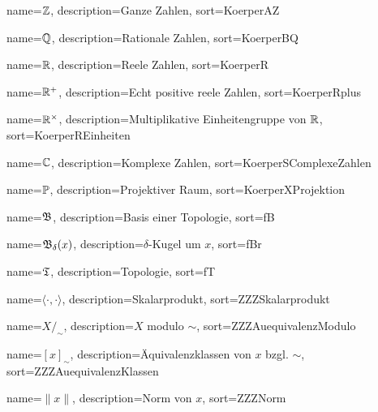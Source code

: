 {
  name={\ensuremath{\mdz}},
  description={Ganze Zahlen},
  sort=KoerperAZ
}

{
  name={\ensuremath{\mdq}},
  description={Rationale Zahlen},
  sort=KoerperBQ
}

{
  name={\ensuremath{\mdr}},
  description={Reele Zahlen},
  sort=KoerperR
}

{
  name={\ensuremath{\mdr^+}},
  description={Echt positive reele Zahlen},
  sort=KoerperRplus
}

{
  name={\ensuremath{\mdr^\times}},
  description={Multiplikative Einheitengruppe von $\mathbb{R}$},
  sort=KoerperREinheiten
}

{
  name={\ensuremath{\mdc}},
  description={Komplexe Zahlen},
  sort=KoerperSComplexeZahlen
}

{
  name={\ensuremath{\mdp}},
  description={Projektiver Raum},
  sort=KoerperXProjektion
}

{
  name={\ensuremath{\fB}},
  description={Basis einer Topologie},
  sort=fB
}

{
  name={\ensuremath{\fB_\delta(x)}},
  description={$\delta$-Kugel um $x$},
  sort=fBr
}

{
  name={\ensuremath{\fT}},
  description={Topologie},
  sort=fT
}

{
  name={\ensuremath{\langle \cdot , \cdot \rangle}},
  description={Skalarprodukt},
  sort=ZZZSkalarprodukt
}

{
  name={\ensuremath{X /_\sim}},
  description={$X$ modulo $\sim$},
  sort=ZZZAuequivalenzModulo
}

{
  name={\ensuremath{[x]_\sim}},
  description={Äquivalenzklassen von $x$ bzgl. $\sim$},
  sort=ZZZAuequivalenzKlassen
}

{
  name={\ensuremath{\| x \|}},
  description={Norm von $x$},
  sort=ZZZNorm
}

